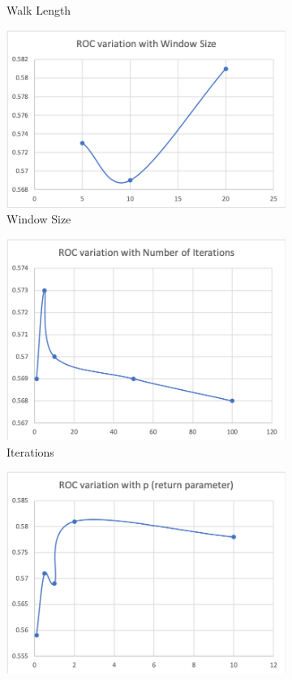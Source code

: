 \documentclass[sigconf]{acmart}
\begin{document}
\begin{figure}[h]
\begin{subfigure}[b]{0.49\linewidth}
    \caption{Walk Length}
  \end{subfigure}
  \begin{subfigure}[b]{0.49\linewidth}
    \includegraphics[width=\linewidth]{Images/Picture 4.png}
    \caption{Window Size}
  \end{subfigure}
  \begin{subfigure}[b]{0.49\linewidth}
    \includegraphics[width=\linewidth]{Images/Picture 5.png}
    \caption{Iterations}
  \end{subfigure}
  \begin{subfigure}[b]{0.49\linewidth}
    \includegraphics[width=\linewidth]{Images/Picture 6.png}

\end{subfigure}
\end{figure}
\end{document}
